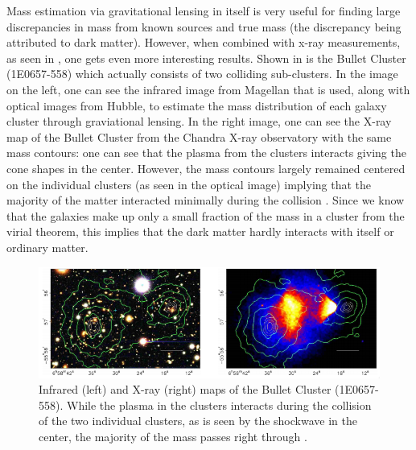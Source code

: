 
Mass estimation via gravitational lensing in itself is very useful for finding large discrepancies in mass from known sources and true mass (the discrepancy being attributed to dark matter).  However, when combined with x-ray measurements, as seen in , one gets even more interesting results.  Shown in  is the Bullet Cluster (1E0657-558) which actually consists of two colliding sub-clusters.  In the image on the left, one can see the infrared image from Magellan that is used, along with optical images from Hubble, to estimate the mass distribution of each galaxy cluster through graviational lensing.  In the right image, one can see the X-ray map of the Bullet Cluster from the Chandra X-ray observatory with the same mass contours: one can see that the plasma from the clusters interacts giving the cone shapes in the center.  However, the mass contours largely remained centered on the individual clusters (as seen in the optical image) implying that the majority of the matter interacted minimally during the collision \cite{clowe2006direct}.  Since we know that the galaxies make up only a small fraction of the mass in a cluster from the virial theorem, this implies that the dark matter hardly interacts with itself or ordinary matter.


\begin{figure}[t]
	\centering
	\includegraphics[width=0.999\textwidth]{bullet_cluster}
	\caption{Infrared (left) and X-ray (right) maps of the Bullet Cluster (1E0657-558).  While the plasma in the clusters interacts during the collision of the two individual clusters, as is seen by the shockwave in the center, the majority of the mass passes right through \cite{clowe2006direct}.}
	\label{fig:bullet_cluster}
\end{figure}



